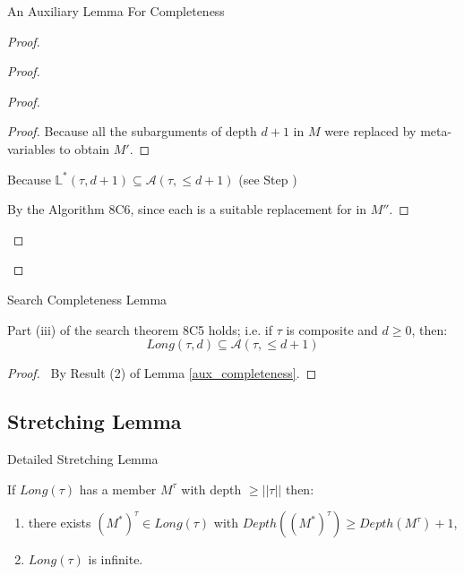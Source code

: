 \begin{frame}[allowframebreaks]{An Auxiliary Lemma For Completeness}
\begin{proof}
\begin{proof}
\begin{proof}
\begin{proof}
Because all the subarguments of depth $d+1$ in $M$ were replaced by meta-variables to obtain $M'$. 
\end{proof}

\medskip


Because $\mathbb{L}^*(\tau, d+1) \subseteq \mathcal{A}(\tau, \leq d+1)$ (see Step )

\medskip 

By the Algorithm 8C6, since each  is a suitable replacement for  in $M''$.

\medskip 

\end{proof}


\end{proof}

\end{proof} 
\end{frame}

\begin{frame}{Search Completeness Lemma}
\begin{lemma}[8F1 in Hindley's]
Part (iii) of the search theorem 8C5 holds; i.e. if $\tau$ is composite and $d \ge 0$, then:
\begin{equation*}
    Long(\tau, d) \subseteq \mathcal{A}(\tau, \le  d+1)
\end{equation*}
\end{lemma}

\begin{proof}
\pf \ By Result (2) of Lemma \ref{aux_completeness}.
\end{proof}
\end{frame}


\subsection{Stretching Lemma}
\begin{frame}{Detailed Stretching Lemma}
\begin{lemma}[8F2 in Hindley's]
\label{stretching_lemma}
If $Long(\tau)$ has a member $M^\tau$ with depth $ \geq ||\tau||$ then: 
\begin{enumerate}
    \item there exists $(M^{*})^{\tau} \in Long(\tau)$ with $Depth((M^{*})^{\tau}) \geq Depth(M^\tau)+1$, 
    \item $Long(\tau)$ is infinite.
\end{enumerate}
\end{lemma}
\end{frame}

